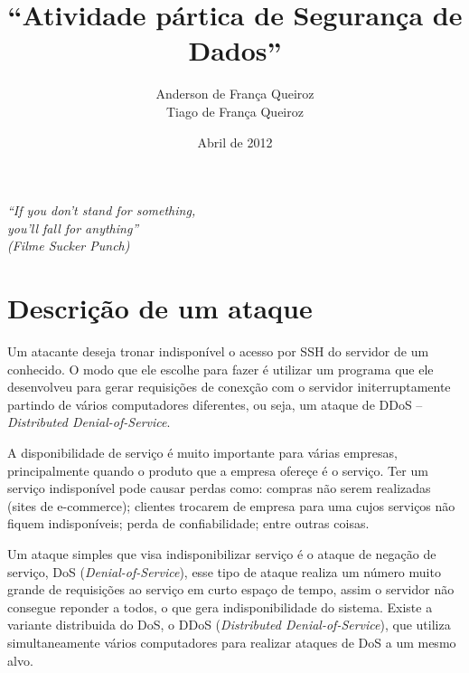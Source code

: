 \documentclass[12pt]{abnt}
\title{``Atividade pártica de Segurança de Dados''}
\author{Anderson de França Queiroz\\
Tiago de França Queiroz}
\date{Abril de 2012}
\begin{document}
\sloppy

\maketitle

\begin{titlepage}

  \vspace{6cm}

  \begin{flushleft}
    \sffamily\slshape
    ``If you don't stand for something,\\
	you'll fall for anything''\\
	(Filme Sucker Punch)
   
    \vspace{1cm}
    
    \end{flushleft}

\end{titlepage}

\tableofcontents
\clearpage

\chapter{Descrição de um ataque}

Um atacante deseja tronar indisponível o acesso por SSH do servidor de um conhecido. O modo que ele escolhe para fazer é utilizar
um programa que ele desenvolveu para gerar requisições de conexção com o servidor initerruptamente partindo de vários computadores
diferentes, ou seja, um ataque de DDoS -- \textit{Distributed Denial-of-Service}.

A disponibilidade de serviço é muito importante para várias empresas, principalmente quando o produto que a empresa ofereçe é o serviço.
Ter um serviço indisponível pode causar perdas como: compras não serem realizadas (sites de e-commerce); clientes trocarem de empresa para uma cujos
serviços não fiquem indisponíveis; perda de confiabilidade; entre outras coisas.

Um ataque simples
que visa indisponibilizar serviço é o ataque de negação de serviço, DoS (\textit{Denial-of-Service}), 
esse tipo de ataque realiza um número muito grande
de requisições ao serviço em curto espaço de tempo, assim o servidor não consegue reponder a todos, o que gera indisponibilidade do sistema.
Existe a variante distribuida do DoS, o DDoS (\textit{Distributed Denial-of-Service}), 
que utiliza simultaneamente vários computadores para realizar ataques de DoS a um mesmo alvo.
\end{document}
